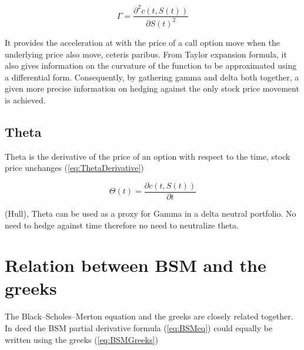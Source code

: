 \documentclass[12pt]{report}
\newcommand{\call}[2]{c\left( #1, #2\right)}
\newcommand{\St}{S\left(t\right)}
\begin{document}
\begin{center}
  \begin{equation}
    \Gamma = \frac{\partial^2\call{t}{\St}}{\partial \St^2}
    \label{eq:GammaDerivative}
  \end{equation}
\end{center}

It provides the acceleration at with the price of a call option move when the underlying price also move, ceteris paribus. From Taylor expansion formula, it also gives information on the curvature of the function to be approximated using a differential form.
Consequently, by gathering gamma and delta both together, a given more precise information on hedging against the only stock price movement is achieved.

\subsection{Theta}
\label{sub:Theta}

Theta is the derivative of the price of an option with respect to the time, stock price unchanges (\ref{eq:ThetaDerivative})

\begin{center}
  \begin{equation}
    \Theta (t) = \frac{\partial \call{t}{\St}}{\partial t}
    \label{eq:ThetaDerivative}
  \end{equation}
\end{center}

(Hull), Theta can be used as a proxy for Gamma in a delta neutral portfolio.
No need to hedge against time therefore no need to neutralize theta.


\section{Relation between BSM and the greeks}
\label{sec:BSMGreeks}

The Black--Scholes--Merton equation and the greeks are closely related together.
In deed the BSM partial derivative formula (\ref{eq:BSMeq}) could equally be written using the greeks (\ref{eq:BSMGreeks})
\end{document}
